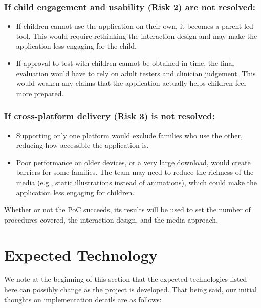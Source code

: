 \documentclass{article}
\begin{document}
\subsubsection*{If child engagement and usability (Risk 2) are not resolved:}
\begin{itemize}
  \item If children cannot use the application on their own, it becomes a
  parent-led tool. This would require rethinking the interaction design and may
  make the application less engaging for the child.
  \item If approval to test with children cannot be obtained in time, the final
  evaluation would have to rely on adult testers and clinician judgement. This
  would weaken any claims that the application actually helps children feel
  more prepared.
\end{itemize}

\subsubsection*{If cross-platform delivery (Risk 3) is not resolved:}
\begin{itemize}
  \item Supporting only one platform would exclude families who use the other,
  reducing how accessible the application is.
  \item Poor performance on older devices, or a very large download, would
  create barriers for some families. The team may need to reduce the richness
  of the media (e.g., static illustrations instead of animations), which could
  make the application less engaging for children.
\end{itemize}

\noindent Whether or not the PoC succeeds, its results will be used to set the number of
procedures covered, the interaction design, and the media approach.

\section{Expected Technology}

We note at the beginning of this section that the expected technologies listed here can possibly change as the project is
developed. That being said, our initial thoughts on implementation details are as follows:
\end{document}
